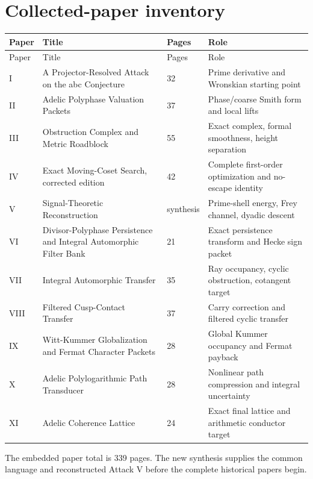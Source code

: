 \section{Collected-paper inventory}
\begin{longtable}{C{0.07\textwidth}L{0.48\textwidth}C{0.10\textwidth}L{0.25\textwidth}}
\toprule
Paper & Title & Pages & Role\\
\midrule
\endfirsthead
\toprule
Paper & Title & Pages & Role\\
\midrule
\endhead
I & A Projector-Resolved Attack on the abc Conjecture & 32 & Prime derivative and Wronskian starting point\\
II & Adelic Polyphase Valuation Packets & 37 & Phase/coarse Smith form and local lifts\\
III & Obstruction Complex and Metric Roadblock & 55 & Exact complex, formal smoothness, height separation\\
IV & Exact Moving-Coset Search, corrected edition & 42 & Complete first-order optimization and no-escape identity\\
V & Signal-Theoretic Reconstruction & synthesis & Prime-shell energy, Frey channel, dyadic descent\\
VI & Divisor-Polyphase Persistence and Integral Automorphic Filter Bank & 21 & Exact persistence transform and Hecke sign packet\\
VII & Integral Automorphic Transfer & 35 & Ray occupancy, cyclic obstruction, cotangent target\\
VIII & Filtered Cusp-Contact Transfer & 37 & Carry correction and filtered cyclic transfer\\
IX & Witt-Kummer Globalization and Fermat Character Packets & 28 & Global Kummer occupancy and Fermat payback\\
X & Adelic Polylogarithmic Path Transducer & 28 & Nonlinear path compression and integral uncertainty\\
XI & Adelic Coherence Lattice & 24 & Exact final lattice and arithmetic conductor target\\
\bottomrule
\end{longtable}

The embedded paper total is 339 pages. The new synthesis supplies the common language and reconstructed Attack V before the complete historical papers begin.


